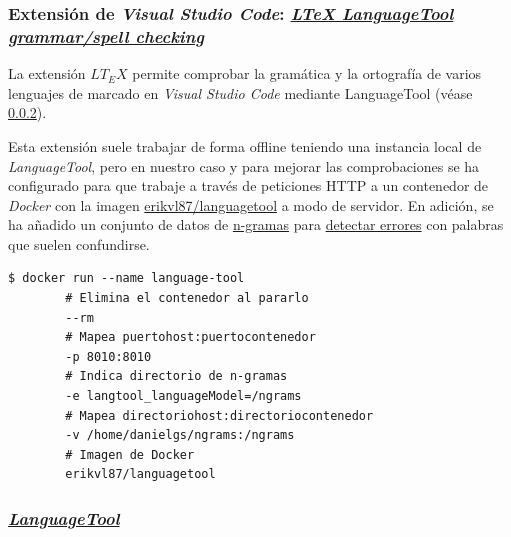 \subsubsection{Extensión de \textit{Visual Studio Code}: \href{https://github.com/valentjn/vscode-ltex}{\textit{LTeX LanguageTool grammar/spell checking}}}

La extensión \( LT_E X \) permite comprobar la gramática y la ortografía de varios lenguajes de marcado en \textit{Visual Studio Code} mediante LanguageTool (véase \ref{sec:languagetool}).

Esta extensión suele trabajar de forma offline teniendo una instancia local de \textit{LanguageTool}, pero en nuestro caso y para mejorar las comprobaciones se ha configurado para que trabaje a través de peticiones HTTP a un contenedor de \textit{Docker} con la imagen \href{https://hub.docker.com/r/erikvl87/languagetool}{erikvl87/languagetool} a modo de servidor. En adición, se ha añadido un conjunto de datos de \href{https://es.wikipedia.org/wiki/N-grama}{n-gramas} para \href{https://dev.languagetool.org/finding-errors-using-n-gram-data}{detectar errores} con palabras que suelen confundirse.


\begin{lstlisting}[title={Orden para iniciar el contenedor con el servidor de LanguageTool}]
    $ docker run --name language-tool
        # Elimina el contenedor al pararlo
        --rm 
        # Mapea puertohost:puertocontenedor
        -p 8010:8010
        # Indica directorio de n-gramas
        -e langtool_languageModel=/ngrams 
        # Mapea directoriohost:directoriocontenedor
        -v /home/danielgs/ngrams:/ngrams 
        # Imagen de Docker
        erikvl87/languagetool 
\end{lstlisting}

\subsubsection{\href{https://github.com/languagetool-org/languagetool}{\textit{LanguageTool}}}
\label{sec:languagetool}

